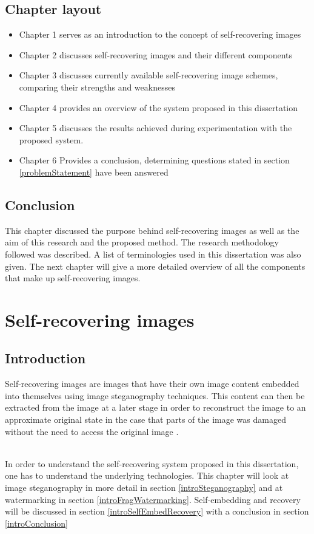 \documentclass[12pt]{article}
\begin{document}
\subsection{Chapter layout}
\begin{itemize}
\item Chapter 1 serves as an introduction to the concept of self-recovering images
\item Chapter 2 discusses self-recovering images and their different components
\item Chapter 3 discusses currently available self-recovering image schemes, comparing their strengths and weaknesses
\item Chapter 4 provides an overview of the system proposed in this dissertation
\item Chapter 5 discusses the results achieved during experimentation with the proposed system.
\item Chapter 6 Provides a conclusion, determining questions stated in section \ref{problemStatement} have been answered
\end{itemize}

\subsection{Conclusion}
This chapter discussed the purpose behind self-recovering images as well as the aim of this research and the proposed method. 
The research methodology followed was described. A list of terminologies used in this dissertation was also given.
The next chapter will give a more detailed overview of all the components that make up self-recovering images. 

\section{Self-recovering images}

\subsection{Introduction}
Self-recovering images are images that have their own image content embedded into themselves using image steganography techniques.
This content can then be extracted from the image at a later stage in order to reconstruct the image to an approximate original state in the case that parts of the image was damaged without the need to access the original image \cite{fridrich1999images}.

\hspace{0pt} \\
In order to understand the self-recovering system proposed in this dissertation, one has to understand the underlying technologies.  This chapter will look at image steganography in more detail in section \ref{introSteganography} and at watermarking in section \ref{introFragWatermarking}. Self-embedding and recovery will be discussed in section \ref{introSelfEmbedRecovery} with a conclusion in section \ref{introConclusion}
\end{document}
